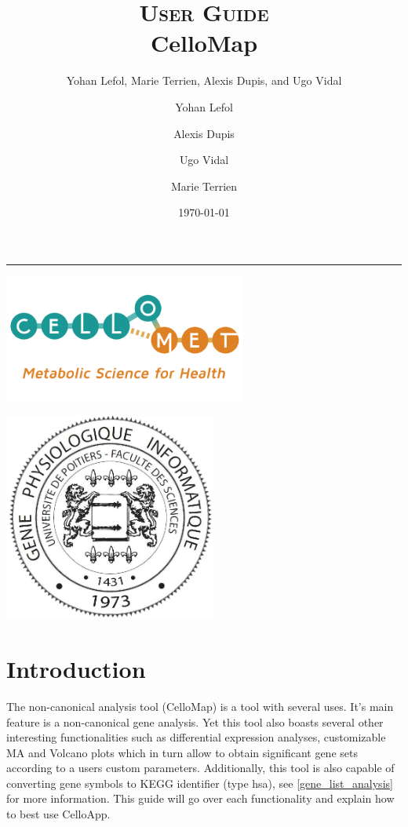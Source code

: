 \documentclass[11pt]{article}
\author{Yohan Lefol, Marie Terrien, Alexis Dupis, and Ugo Vidal}
\title{
\textsc{User Guide}\\[2.6cm]
{\LARGE \bfseries CelloMap}
}
\author{
Yohan Lefol
\and 
Alexis Dupis
\and
Ugo Vidal
\and
Marie Terrien
}
\date{
\today
}
\begin{document}
\maketitle
\hrule
\begin{center}
\includegraphics[width = 8cm]{logo-CELLOMET-a.png}
\end{center}

\begin{center}
\includegraphics[width = 7cm]{Logo-Master-GPhy.png}
\end{center}
\thispagestyle{empty}

\doublespacing
\tableofcontents
\singlespacing

\newpage
\section{Introduction \label{intro}}
The non-canonical analysis tool (CelloMap) is a tool with several uses. It's main feature is a non-canonical gene analysis. Yet this tool also boasts several other interesting functionalities such as differential expression analyses, customizable MA and Volcano plots which in turn allow to obtain significant gene sets according to a users custom parameters. Additionally, this tool is also capable of converting gene symbols to KEGG identifier (type hsa), see \autoref{gene_list_analysis} for more information.
This guide will go over each functionality and explain how to best use CelloApp.
\end{document}
